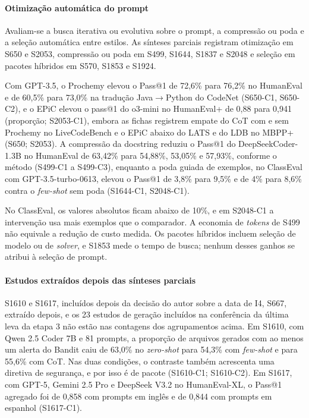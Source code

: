 \paragraph{Otimização automática do prompt}
Avaliam-se a busca iterativa ou evolutiva sobre o prompt, a compressão ou poda e a seleção automática entre estilos. As sínteses parciais registram otimização em S650 e S2053, compressão ou poda em S499, S1644, S1837 e S2048 e seleção em pacotes híbridos em S570, S1853 e S1924.

Com GPT-3.5, o Prochemy elevou o Pass@1 de 72,6\% para 76,2\% no HumanEval e de 60,5\% para 73,0\% na tradução Java$\rightarrow$Python do CodeNet (S650-C1, S650-C2), e o EPiC elevou o pass@1 do o3-mini no HumanEval+ de 0,88 para 0,941 (proporção; S2053-C1), embora as fichas registrem empate do CoT com e sem Prochemy no LiveCodeBench e o EPiC abaixo do LATS e do LDB no MBPP+ (S650; S2053).
A compressão da docstring reduziu o Pass@1 do DeepSeekCoder-1.3B no HumanEval de 63,42\% para 54,88\%, 53,05\% e 57,93\%, conforme o método (S499-C1 a S499-C3), enquanto a poda guiada de exemplos, no ClassEval com GPT-3.5-turbo-0613, elevou o Pass@1 de 3,8\% para 9,5\% e de 4\% para 8,6\% contra o \textit{few-shot} sem poda (S1644-C1, S2048-C1).

No ClassEval, os valores absolutos ficam abaixo de 10\%, e em S2048-C1 a intervenção usa mais exemplos que o comparador. A economia de \textit{tokens} de S499 não equivale a redução de custo medida. Os pacotes híbridos incluem seleção de modelo ou de \textit{solver}, e S1853 mede o tempo de busca; nenhum desses ganhos se atribui à seleção de prompt.

\paragraph{Estudos extraídos depois das sínteses parciais}
S1610 e S1617, incluídos depois da decisão do autor sobre a data de I4, S667, extraído depois, e os 23 estudos de
geração incluídos na conferência da última leva da etapa 3 não estão nas contagens dos agrupamentos acima.
Em S1610, com Qwen 2.5 Coder 7B e 81 prompts, a proporção de arquivos gerados com ao menos um alerta do Bandit caiu
de 63,0\% no \textit{zero-shot} para 54,3\% com \textit{few-shot} e para 55,6\% com CoT. Nas duas condições, o contraste também
acrescenta uma diretiva de segurança, e por isso é de pacote (S1610-C1; S1610-C2).
Em S1617, com GPT-5, Gemini 2.5 Pro e DeepSeek V3.2 no HumanEval-XL, o Pass@1 agregado foi de 0,858 com prompts em inglês e de 0,844 com prompts em espanhol (S1617-C1).

